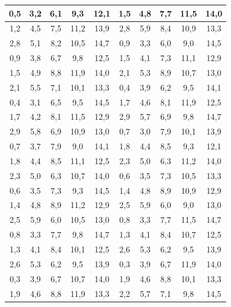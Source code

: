 \documentclass[12pt,a4paper]{article}
\begin{document}
\normalsize %
\begin{center}
\begin{tabular}{|*{10}{c|}}
\hline
0,5 & 3,2 & 6,1 & 9,3 & 12,1 & 1,5 & 4,8 & 7,7 & 11,5 & 14,0 \\
\hline
1,2 & 4,5 & 7,5 & 11,2 & 13,9 & 2,8 & 5,9 & 8,4 & 10,9 & 13,3 \\
\hline
2,8 & 5,1 & 8,2 & 10,5 & 14,7 & 0,9 & 3,3 & 6,0 & 9,0 & 14,5 \\
\hline
0,9 & 3,8 & 6,7 & 9,8 & 12,5 & 1,5 & 4,1 & 7,3 & 11,1 & 12,9 \\
\hline
1,5 & 4,9 & 8,8 & 11,9 & 14,0 & 2,1 & 5,3 & 8,9 & 10,7 & 13,0 \\
\hline
2,1 & 5,5 & 7,1 & 10,1 & 13,3 & 0,4 & 3,9 & 6,2 & 9,5 & 14,1 \\
\hline
0,4 & 3,1 & 6,5 & 9,5 & 14,5 & 1,7 & 4,6 & 8,1 & 11,9 & 12,5 \\
\hline
1,7 & 4,2 & 8,1 & 11,5 & 12,9 & 2,9 & 5,7 & 6,9 & 9,8 & 14,7 \\
\hline
2,9 & 5,8 & 6,9 & 10,9 & 13,0 & 0,7 & 3,0 & 7,9 & 10,1 & 13,9 \\
\hline
0,7 & 3,7 & 7,9 & 9,0 & 14,1 & 1,8 & 4,4 & 8,5 & 9,3 & 12,1 \\
\hline
1,8 & 4,4 & 8,5 & 11,1 & 12,5 & 2,3 & 5,0 & 6,3 & 11,2 & 14,0 \\
\hline
2,3 & 5,0 & 6,3 & 10,7 & 14,0 & 0,6 & 3,5 & 7,3 & 10,5 & 13,3 \\
\hline
0,6 & 3,5 & 7,3 & 9,3 & 14,5 & 1,4 & 4,8 & 8,9 & 10,9 & 12,9 \\
\hline
1,4 & 4,8 & 8,9 & 11,2 & 12,9 & 2,5 & 5,9 & 6,0 & 9,0 & 13,0 \\
\hline
2,5 & 5,9 & 6,0 & 10,5 & 13,0 & 0,8 & 3,3 & 7,7 & 11,5 & 14,7 \\
\hline
0,8 & 3,3 & 7,7 & 9,8 & 14,7 & 1,3 & 4,1 & 8,4 & 10,7 & 12,5 \\
\hline
1,3 & 4,1 & 8,4 & 10,1 & 12,5 & 2,6 & 5,3 & 6,2 & 9,5 & 13,9 \\
\hline
2,6 & 5,3 & 6,2 & 9,5 & 13,9 & 0,3 & 3,9 & 6,7 & 11,9 & 14,0 \\
\hline
0,3 & 3,9 & 6,7 & 10,7 & 14,0 & 1,9 & 4,6 & 8,8 & 10,1 & 13,3 \\
\hline
1,9 & 4,6 & 8,8 & 11,9 & 13,3 & 2,2 & 5,7 & 7,1 & 9,8 & 14,5 \\
\hline
\end{tabular}
\end{center}
\normalsize
\end{document}
